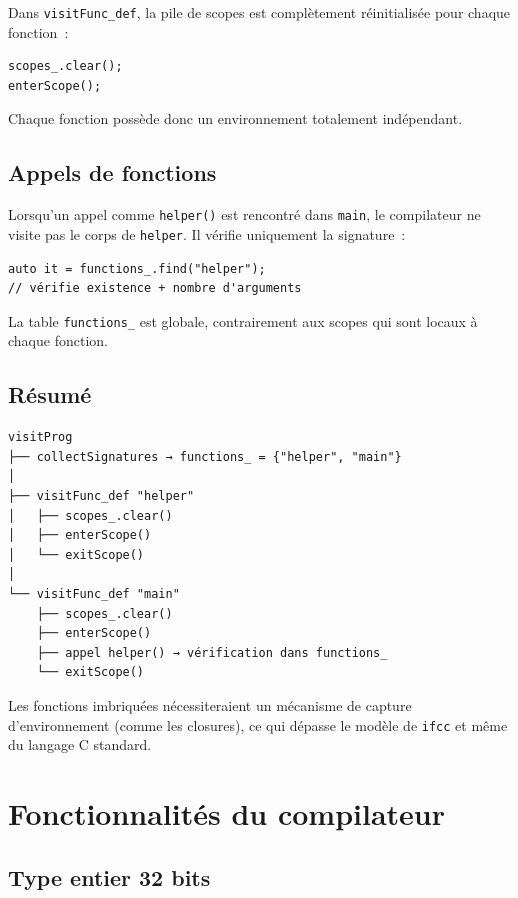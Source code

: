 \documentclass[11pt,a4paper]{article}
\begin{document}
Dans \texttt{visitFunc\_def}, la pile de scopes est complètement réinitialisée pour chaque fonction~:

\begin{lstlisting}
scopes_.clear();
enterScope();
\end{lstlisting}

Chaque fonction possède donc un environnement totalement indépendant.

\subsection{Appels de fonctions}

Lorsqu'un appel comme \texttt{helper()} est rencontré dans \texttt{main}, le compilateur ne visite pas le corps de \texttt{helper}. Il vérifie uniquement la signature~:

\begin{lstlisting}
auto it = functions_.find("helper");
// vérifie existence + nombre d'arguments
\end{lstlisting}

La table \texttt{functions\_} est globale, contrairement aux scopes qui sont locaux à chaque fonction.

\subsection{Résumé}

\begin{lstlisting}
visitProg
├── collectSignatures → functions_ = {"helper", "main"}
│
├── visitFunc_def "helper"
│   ├── scopes_.clear()
│   ├── enterScope()
│   └── exitScope()
│
└── visitFunc_def "main"
    ├── scopes_.clear()
    ├── enterScope()
    ├── appel helper() → vérification dans functions_
    └── exitScope()
\end{lstlisting}

Les fonctions imbriquées nécessiteraient un mécanisme de capture d'environnement (comme les closures), ce qui dépasse le modèle de \texttt{ifcc} et même du langage C standard.

\section{Fonctionnalités du compilateur}

\subsection{Type entier 32 bits}
\end{document}
